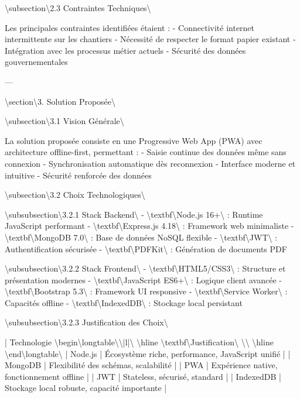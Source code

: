 \documentclass[12pt,a4paper]{report}
\begin{document}
\textbackslash{}subsection\textbackslash{}{2.3 Contraintes Techniques\textbackslash{}}

Les principales contraintes identifiées étaient :
- Connectivité internet intermittente sur les chantiers
- Nécessité de respecter le format papier existant
- Intégration avec les processus métier actuels
- Sécurité des données gouvernementales

---

\textbackslash{}section\textbackslash{}{3. Solution Proposée\textbackslash{}}

\textbackslash{}subsection\textbackslash{}{3.1 Vision Générale\textbackslash{}}

La solution proposée consiste en une Progressive Web App (PWA) avec architecture offline-first, permettant :
- Saisie continue des données même sans connexion
- Synchronisation automatique dès reconnexion
- Interface moderne et intuitive
- Sécurité renforcée des données

\textbackslash{}subsection\textbackslash{}{3.2 Choix Technologiques\textbackslash{}}

\textbackslash{}subsubsection\textbackslash{}{3.2.1 Stack Backend\textbackslash{}}
- \textbackslash{}textbf\textbackslash{}{Node.js 16+\textbackslash{}} : Runtime JavaScript performant
- \textbackslash{}textbf\textbackslash{}{Express.js 4.18\textbackslash{}} : Framework web minimaliste
- \textbackslash{}textbf\textbackslash{}{MongoDB 7.0\textbackslash{}} : Base de données NoSQL flexible
- \textbackslash{}textbf\textbackslash{}{JWT\textbackslash{}} : Authentification sécurisée
- \textbackslash{}textbf\textbackslash{}{PDFKit\textbackslash{}} : Génération de documents PDF

\textbackslash{}subsubsection\textbackslash{}{3.2.2 Stack Frontend\textbackslash{}}
- \textbackslash{}textbf\textbackslash{}{HTML5/CSS3\textbackslash{}} : Structure et présentation modernes
- \textbackslash{}textbf\textbackslash{}{JavaScript ES6+\textbackslash{}} : Logique client avancée
- \textbackslash{}textbf\textbackslash{}{Bootstrap 5.3\textbackslash{}} : Framework UI responsive
- \textbackslash{}textbf\textbackslash{}{Service Worker\textbackslash{}} : Capacités offline
- \textbackslash{}textbf\textbackslash{}{IndexedDB\textbackslash{}} : Stockage local persistant

\textbackslash{}subsubsection\textbackslash{}{3.2.3 Justification des Choix\textbackslash{}}

| Technologie \textbackslash{}begin\textbackslash{}{longtable\textbackslash{}}\textbackslash{}{|l|\textbackslash{}}
\textbackslash{}hline
\textbackslash{}textbf\textbackslash{}{Justification\textbackslash{}} \textbackslash{}\textbackslash{}
\textbackslash{}hline
\textbackslash{}end\textbackslash{}{longtable\textbackslash{}}
| Node.js | Écosystème riche, performance, JavaScript unifié |
| MongoDB | Flexibilité des schémas, scalabilité |
| PWA | Expérience native, fonctionnement offline |
| JWT | Stateless, sécurisé, standard |
| IndexedDB | Stockage local robuste, capacité importante |
\end{document}
